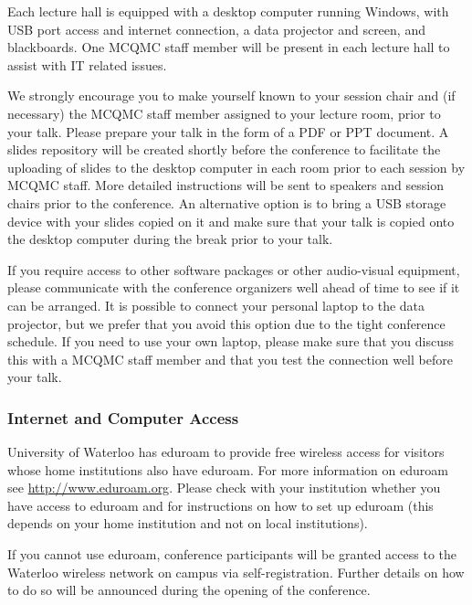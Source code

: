 Each lecture hall is equipped with a desktop computer running Windows,
with USB port access and internet connection, a data projector and screen, 
and blackboards. One MCQMC staff member 
will be present 
in each lecture hall to assist with IT related issues.

We strongly encourage you to make yourself known to your session chair and (if necessary) 
the MCQMC staff member assigned to your lecture room, prior to your talk. Please prepare your talk in the form of a PDF or PPT document. A slides repository will be created shortly before the conference to facilitate the uploading of slides to the desktop computer in each room prior to each session by MCQMC staff. More detailed instructions will be sent to speakers and session chairs prior to the conference. An alternative option is to bring 
a USB storage device with your slides copied on it and make sure that your talk is copied onto
the desktop computer during the break prior to your talk. 

If you require access to other software packages or other audio-visual
equipment, please communicate with the conference organizers well ahead of time to
see if it can be arranged. It is possible to connect your personal laptop
to the data projector, but we prefer that you avoid this option due to the
tight conference schedule. If you need to use your own laptop, please make
sure that you discuss this with a MCQMC staff member %
and 
that you test the connection well before your talk.


\subsubsection{Internet and Computer Access}

University of Waterloo has eduroam to provide free wireless access for visitors whose home
institutions also have eduroam. For more information on eduroam see
\url{http://www.eduroam.org}. Please check with your institution whether you have access to eduroam and
for instructions on how to set up eduroam (this depends on your home
institution and not on local institutions).

If you cannot use eduroam, conference participants will be granted access to the Waterloo wireless network on campus via self-registration. Further details on how to do so will be announced during the opening of the conference. 

